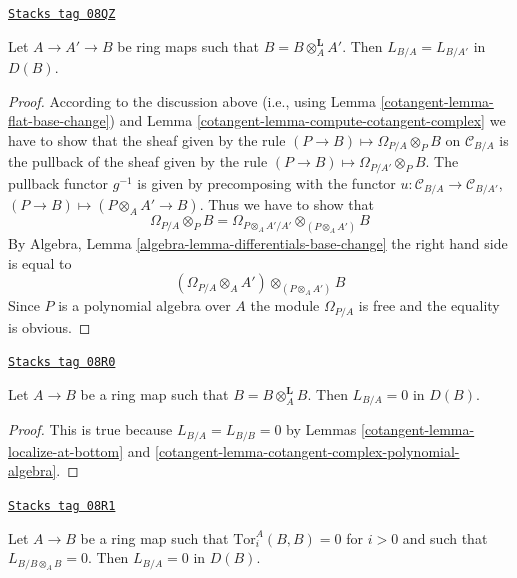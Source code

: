 \begin{lemma}
\label{cotangent-lemma-localize-at-bottom}
\href{https://stacks.math.columbia.edu/tag/08QZ}{\texttt{Stacks tag 08QZ}}

Let $A \to A' \to B$ be ring maps such that $B = B \otimes_A^\mathbf{L} A'$.
Then $L_{B/A} = L_{B/A'}$ in $D(B)$.
\end{lemma}

\begin{proof}

According to the discussion above (i.e., using
Lemma \ref{cotangent-lemma-flat-base-change})
and Lemma \ref{cotangent-lemma-compute-cotangent-complex}
we have to show that the sheaf given
by the rule $(P \to B) \mapsto \Omega_{P/A} \otimes_P B$ on $\mathcal{C}_{B/A}$
is the pullback of the sheaf given by the rule
$(P \to B) \mapsto \Omega_{P/A'} \otimes_P B$.
The pullback functor $g^{-1}$ is given by precomposing with the
functor $u : \mathcal{C}_{B/A} \to \mathcal{C}_{B/A'}$,
$(P \to B) \mapsto (P \otimes_A A' \to B)$.
Thus we have to show that
$$
\Omega_{P/A} \otimes_P B =
\Omega_{P \otimes_A A'/A'} \otimes_{(P \otimes_A A')} B
$$
By Algebra, Lemma \ref{algebra-lemma-differentials-base-change}
the right hand side is equal to
$$
(\Omega_{P/A} \otimes_A A') \otimes_{(P \otimes_A A')} B
$$
Since $P$ is a polynomial algebra over $A$ the module
$\Omega_{P/A}$ is free and the equality is obvious.
\end{proof}

\begin{lemma}
\label{cotangent-lemma-derived-diagonal}
\href{https://stacks.math.columbia.edu/tag/08R0}{\texttt{Stacks tag 08R0}}

Let $A \to B$ be a ring map such that $B = B \otimes_A^\mathbf{L} B$.
Then $L_{B/A} = 0$ in $D(B)$.
\end{lemma}

\begin{proof}

This is true because $L_{B/A} = L_{B/B} = 0$ by
Lemmas \ref{cotangent-lemma-localize-at-bottom} and
\ref{cotangent-lemma-cotangent-complex-polynomial-algebra}.
\end{proof}

\begin{lemma}[Bootstrap]
\label{cotangent-lemma-bootstrap}
\href{https://stacks.math.columbia.edu/tag/08R1}{\texttt{Stacks tag 08R1}}

Let $A \to B$ be a ring map such that $\text{Tor}^A_i(B, B) = 0$ for $i > 0$
and such that $L_{B/B \otimes_A B} = 0$.
Then $L_{B/A} = 0$ in $D(B)$.
\end{lemma}

